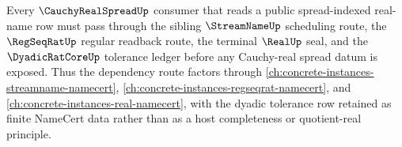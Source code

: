 \begin{theorem}
\label{thm:cauchy-real-spread-streamname-regseqrat-dependency-anchor}
Every $\CauchyRealSpreadUp$ consumer that reads a public spread-indexed real-name row must pass through the sibling $\StreamNameUp$ scheduling route, the $\RegSeqRatUp$ regular readback route, the terminal $\RealUp$ seal, and the $\DyadicRatCoreUp$ tolerance ledger before any Cauchy-real spread datum is exposed. Thus the dependency route factors through \autoref{ch:concrete-instances-streamname-namecert}, \autoref{ch:concrete-instances-regseqrat-namecert}, and \autoref{ch:concrete-instances-real-namecert}, with the dyadic tolerance row retained as finite NameCert data rather than as a host completeness or quotient-real principle.
\end{theorem}
